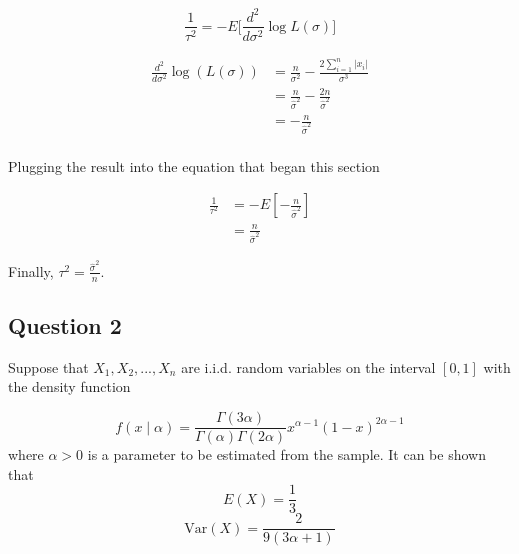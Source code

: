 \documentclass{tufte-book}
\newcommand{\Var}{\mathrm{Var}}
\theoremstyle{mytheoremstyle}
\theoremstyle{mylemstyle}
\theoremstyle{mydefstyle}
\begin{document}
\begin{enumerate}
\[
\frac{1}{\tau^2} = -E\Big[\frac{d^2}{d\sigma^2}\log L(\sigma)\Big]
\]

\begin{align*}
\frac{d^2}{d\sigma^2}\log(L(\sigma)) &= \frac{n}{\sigma^2} - \frac{2\sum_{i=1}^n |x_i|}{\sigma^3}\\
&= \frac{n}{\hat{\sigma}^2} - \frac{2n}{\hat{\sigma}^2}\\
&= -\frac{n}{\hat{\sigma}^2}\\
\end{align*}

Plugging the result into the equation that began this section

\begin{align*}
\frac{1}{\tau^2} &= -E[-\frac{n}{\hat{\sigma}^2}]\\
&= \frac{n}{\hat{\sigma}^2}
\end{align*}

Finally, $\tau^2 = \frac{\hat{\sigma}^2}{n}$.

\end{enumerate}


\subsection{Question 2}
Suppose that $X_1, X_2, ..., X_n$ are i.i.d. random variables on the interval $[0,1]$ with the density function

\[f(x\mid \alpha) = \frac{\Gamma(3\alpha)}{\Gamma(\alpha)\Gamma(2\alpha)}x^{\alpha-1}(1-x)^{2\alpha -1} \]
where $\alpha > 0$ is a parameter to be estimated from the sample.  It can be shown that
\[ E(X) = \frac{1}{3} \]
\[ \Var(X) = \frac{2}{9(3\alpha+1)}\]
\end{document}

